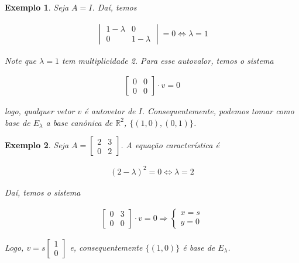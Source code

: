 \documentclass{article}
\newtheorem*{example}{Exemplo}
\begin{document}
\begin{example}
	Seja $A = I$. Daí, temos
	
	\begin{align*}
	\begin{vmatrix}
	1 - \lambda & 0 \\
	0 & 1 - \lambda
	\end{vmatrix} = 0 \Leftrightarrow \lambda = 1
	\end{align*}
	
	\par\vspace{0.3cm} Note que $\lambda = 1$ tem multiplicidade 2. Para esse autovalor, temos o sistema
	
	\begin{align*}
	\begin{bmatrix}
	0 & 0 \\
	0 & 0 
	\end{bmatrix}\cdot v = 0
	\end{align*}
	
	\par\vspace{0.3cm} logo, qualquer vetor $v$ é autovetor de $I$. Consequentemente, podemos tomar como base de $E_{\lambda}$ a base canônica de $\mathbb{R}^2$, $\{(1,0), (0,1)\}$.
	
\end{example}

\begin{example}
	Seja $A = \begin{bmatrix}
	2 & 3 \\
	0 & 2
	\end{bmatrix}$. A equação característica é
	
	\begin{align*}
	(2 - \lambda)^2 = 0 \Leftrightarrow \lambda = 2
	\end{align*}
	
	\par\vspace{0.3cm} Daí, temos o sistema
	
	\begin{align*}
	\begin{bmatrix}
	0 & 3 \\
	0 & 0 
	\end{bmatrix}\cdot v = 0 \Rightarrow \begin{cases}
	x = s\\
	y = 0
	\end{cases}
	\end{align*}
	
	\par\vspace{0.3cm} Logo, $\displaystyle{v = s\begin{bmatrix}
		1\\
		0
		\end{bmatrix}}$ e, consequentemente $\{(1,0)\}$ é base de $E_{\lambda}$.
	
\end{example}
\end{document}
